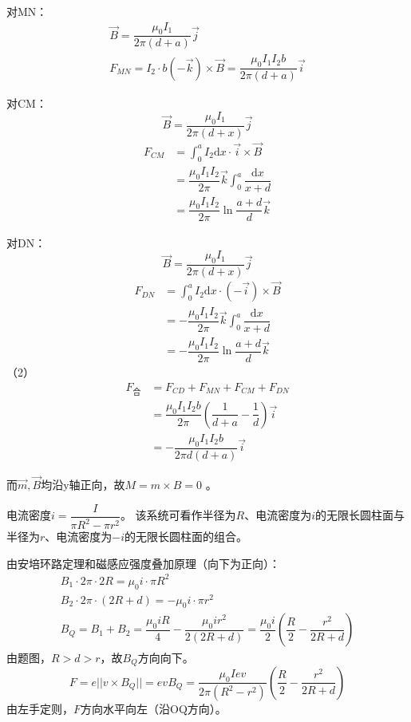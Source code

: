 \documentclass[b5paper,opensource]{./template/qyxf-book}
\newcommand{\di}[1]{\mathrm{d}#1}
\begin{document}
对MN：
\begin{gather*}
	\vec{B}=\dfrac{\mu_0I_1}{2\pi (d+a)}\vec{j}\\
	F_{MN}=I_2\cdot b(-\vec{k})\times \vec{B}=\dfrac{\mu_0I_1I_2b}{2\pi (d+a)}\vec{i}
\end{gather*}

对CM：
\[
\vec{B}=\dfrac{\mu_0I_1}{2\pi (d+x)}\vec{j}
\]
\begin{align*}
	F_{CM}&=\int_{0}^{a}I_2\di{x}\cdot\vec{i}\times \vec{B}\\
	&=\dfrac{\mu_0I_1I_2}{2\pi}\vec{k}\int_{0}^{a}\dfrac{\di{x}}{x+d}\\
	&=\dfrac{\mu_0I_1I_2}{2\pi}\ln\dfrac{a+d}{d}\vec{k}
\end{align*}

对DN：
\[
\vec{B}=\dfrac{\mu_0I_1}{2\pi (d+x)}\vec{j}
\]
\begin{align*}
	F_{DN}&=\int_{0}^{a}I_2\di{x}\cdot(-\vec{i})\times \vec{B}\\
	&=-\dfrac{\mu_0I_1I_2}{2\pi}\vec{k}\int_{0}^{a}\dfrac{\di{x}}{x+d}\\
	&=-\dfrac{\mu_0I_1I_2}{2\pi}\ln\dfrac{a+d}{d}\vec{k}
\end{align*}
（2）
\begin{align*}
	F_\text{合}&=F_{CD}+F_{MN}+F_{CM}+F_{DN}\\
	&=\dfrac{\mu_0I_1I_2b}{2\pi}(\dfrac{1}{d+a}-\dfrac{1}{d})\vec{i}\\
	&=-\dfrac{\mu_0I_1I_2b}{2\pi d(d+a)}\vec{i}
\end{align*}

而$\vec{m},\vec{B}$均沿y轴正向，故$M=m\times B=0$
\footnotemark[5]。


\solve
电流密度$i=\dfrac{I}{\pi R^2-\pi r^2}$。
该系统可看作半径为$R$、电流密度为$i$的无限长圆柱面与半径为$r$、电流密度为$-i$的无限长圆柱面的组合。

由安培环路定理和磁感应强度叠加原理（向下为正向）：
\begin{gather*}
	B_1\cdot 2\pi\cdot 2R=\mu_0i\cdot\pi R^2\\
	B_2\cdot 2\pi\cdot (2R+d)=-\mu_0i\cdot\pi r^2\\
	B_Q=B_1+B_2=\dfrac{\mu_0iR}{4}-\dfrac{\mu_0ir^2}{2(2R+d)}=\dfrac{\mu_0i}{2}(\dfrac{R}{2}-\dfrac{r^2}{2R+d})
\end{gather*}
由题图，$R>d>r$，故$B_Q$方向向下。
\[
F=e||v\times B_Q||=evB_Q=\dfrac{\mu_0Iev}{2\pi(R^2-r^2)}(\dfrac{R}{2}-\dfrac{r^2}{2R+d})
\]
由左手定则，$F$方向水平向左（沿OQ方向）。
\end{document}
